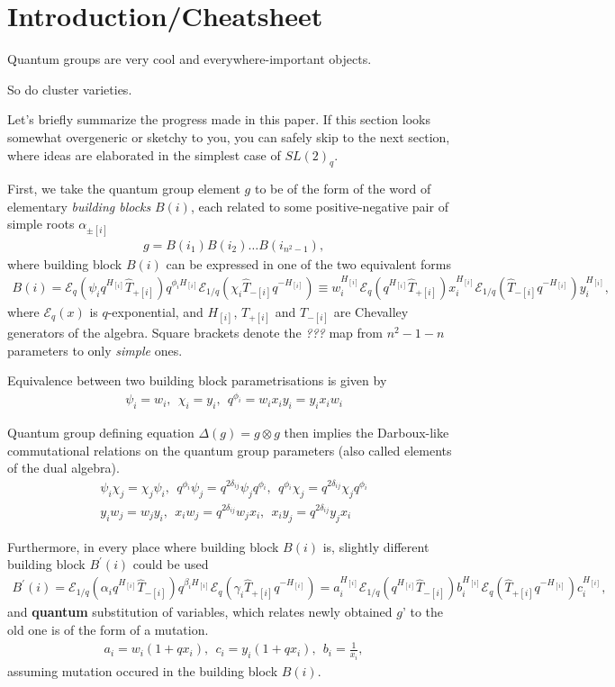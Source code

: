 \documentclass{article}
\newcommand{\lb}{\left (}
\newcommand{\rb}{\right )}
\newcommand{\lsb}{\left [}
\newcommand{\rsb}{\right ]}
\newcommand{\be}{\begin{eqnarray}}
\newcommand{\ee}{\end{eqnarray}}
\newcommand {\?}{\textit{???}}
\newcommand{\me}[0]{\mathcal{E}}
\newcommand{\hT}[0]{\hat{T}}
\newcommand{\Bp}[1]{B^{'}\lb #1 \rb}
\def\dg{\Delta (g)}
\def\gog{g \otimes g}
\begin{document}
\section{Introduction/Cheatsheet}
Quantum groups are very cool and everywhere-important objects.

So do cluster varieties.

Let's briefly summarize the progress made in this paper.
If this section looks somewhat overgeneric or sketchy to you, you can safely skip to the next
section, where ideas are elaborated in the simplest case of $SL(2)_q$.

First, we take the quantum group element $g$ to be of the form
of the word of elementary {\it building blocks} $B(i)$, each related to some positive-negative pair
of simple roots $\alpha_{\pm \lsb i \rsb}$
\be
g = B \lb i_1 \rb B \lb i_2 \rb \dots B \lb i_{n^2-1} \rb,
\ee
where building block $B(i)$ can be expressed in one of the two equivalent forms
\be
B(i) = \me_q \lb \psi_i q^{H_{[i]}} \hT_{+[i]} \rb q^{\phi_i H_{[i]}} \me_{1/q} \lb \chi_i \hT_{-[i]} q^{-H_{[i]}} \rb
\equiv
w_i^{H_{[i]}} \me_q \lb q^{H_{[i]}} \hT_{+[i]} \rb x_i^{H_{[i]}} \me_{1/q} \lb \hT_{-[i]} q^{-H_{[i]}} \rb y_i^{H_{[i]}},
\ee
where $\me_q(x)$ is $q$-exponential, and $H_{[i]}$, $T_{+[i]}$ and $T_{-[i]}$ are Chevalley generators of the algebra.
Square brackets denote the \? map from $n^2-1-n$ parameters to only {\it simple} ones.

Equivalence between two building block parametrisations is given by
\be
\psi_i = w_i,\ \ \chi_i = y_i,\ \ q^{\phi_i} = w_i x_i y_i = y_i x_i w_i
\ee

Quantum group defining equation $\dg = \gog$ then implies the Darboux-like commutational
relations on the quantum group parameters (also called elements of the dual algebra).
\be
& \psi_i \chi_j = \chi_j \psi_i, \ \ q^{\phi_i} \psi_j = q^{2 \delta_{ij}} \psi_j q^{\phi_i}, \ \
q^{\phi_i} \chi_j = q^{2 \delta_{ij}} \chi_j q^{\phi_i} & \\ &
y_i w_j = w_j y_i, \ \ x_i w_j = q^{2\delta_{ij}} w_j x_i, \ \ x_i y_j = q^{2\delta_{ij}} y_j x_i
\ee

Furthermore, in every place where building block $B(i)$ is, slightly
different building block $\Bp{i}$ could be used
\be
\Bp{i} = \me_{1/q} \lb \alpha_i q^{H_{[i]}} \hT_{-[i]} \rb q^{\beta_i H_{[i]}} \me_q \lb \gamma_i \hT_{+[i]} q^{-H_{[i]}} \rb   = 
a_i^{H_{[i]}} \me_{1/q} \lb q^{H_{[i]}} \hT_{-[i]} \rb b_i^{H_{[i]}} \me_q \lb  \hT_{+[i]} q^{-H_{[i]}} \rb c_i^{H_{[i]}},
\ee
and {\bf quantum} substitution of variables, which relates newly obtained $g$' to the old one
is of the form of a mutation.
\be
a_i = w_i(1 + q x_i), \ \ c_i = y_i(1 + q x_i), \ \ b_i = \frac{1}{x_i},
\ee 
assuming mutation occured in the building block $B(i)$.
\end{document}
